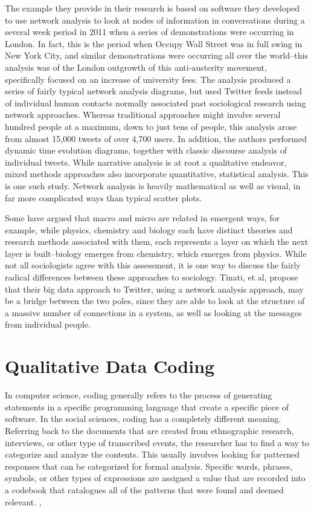\documentclass[sigconf]{acmart}
\begin{document}
The example they provide in their research is based on software they developed to use network analysis to look at nodes of information in conversations during a several week period in 2011 when a series of demonstrations were occurring in London. \cite{tinati14} In fact, this is the period when Occupy Wall Street was in full swing in New York City, and similar demonstrations were occurring all over the world--this analysis was of the London outgrowth of this anti-austerity movement, specifically focused on an increase of university fees.  The analysis produced a series of fairly typical network analysis diagrams, but used Twitter feeds instead of individual human contacts normally associated past sociological research using network approaches.  Whereas traditional approaches might involve several hundred people at a maximum, down to just tens of people, this analysis arose from almost 15,000 tweets of over 4,700 users.  In addition, the authors performed dynamic time evolution diagrams, together with classic discourse analysis of individual tweets.  While narrative analysis is at root a qualitative endeavor, mixed methods approaches also incorporate quantitative, statistical analysis.  This is one such study.  Network analysis is heavily mathematical as well as visual, in far more complicated ways than typical scatter plots. \cite{tinati14}

Some have argued that macro and micro are related in emergent ways, for example, while physics, chemistry and biology each have distinct theories and research methods associated with them, each represents a layer on which the next layer is built--biology emerges from chemistry, which emerges from physics. \cite{sawyer07}  While not all sociologists agree with this assessment, it is one way to discuss the fairly radical differences between these approaches to sociology.  Tinati, et al, propose that their big data approach to Twitter, using a network analysis approach, may be a bridge between the two poles, since they are able to look at the structure of a massive number of connections in a system, as well as looking at the messages from individual people. \cite{tinati14} 

\section{Qualitative Data Coding}
In computer science, coding generally refers to the process of generating statements in a specific programming language that create a specific piece of software.  In the social sciences, coding has a completely different meaning.  Referring back to the documents that are created from ethnographic research, interviews, or other type of transcribed events, the researcher has to find a way to categorize and analyze the contents.  This usually involves looking for patterned responses that can be categorized for formal analysis.  Specific words, phrases, symbols, or other types of expressions are assigned a value that are recorded into a codebook that catalogues all of the patterns that were found and deemed relevant. \cite{singleton18}, \cite{bryman16}
\end{document}
